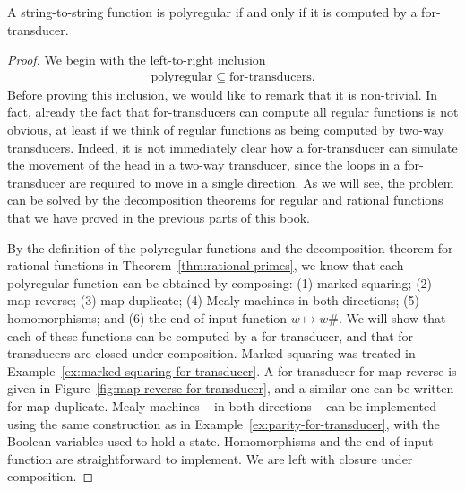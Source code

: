 \begin{theorem}
  \label{thm:for-transducers-are-polyregular}
  A string-to-string function is  polyregular if and only if it is computed by a for-transducer. 
\end{theorem}
\begin{proof}
We begin with the left-to-right inclusion
\begin{align*}
\text{polyregular} \subseteq \text{for-transducers}.
\end{align*}
Before proving this inclusion, we would like to remark that it is non-trivial. In fact, already the fact that for-transducers can compute all regular functions is not obvious, at least if we think of regular functions as being computed by two-way transducers. Indeed, it is not immediately clear how a for-transducer can simulate the movement of the head in a two-way transducer, since the loops in a for-transducer are required to move in  a single direction. As we will see, the problem can be solved by the decomposition theorems for regular and rational functions that we have proved in the previous parts of this book.

 By the definition of the polyregular functions and the decomposition theorem for rational functions in Theorem~\ref{thm:rational-primes}, we know that each polyregular function can be obtained by composing: (1) marked squaring; (2) map reverse; (3) map duplicate; (4) Mealy machines in both directions; (5) homomorphisms; and (6) the end-of-input function $w \mapsto w\#$. We will show that each of these functions can be computed by a for-transducer, and that for-transducers are closed under composition. Marked squaring was treated in Example~\ref{ex:marked-squaring-for-transducer}. A for-transducer for map reverse is given in Figure~\ref{fig:map-reverse-for-transducer}, and a similar one can be written for map duplicate. Mealy machines -- in both directions -- can be implemented using the same construction as in Example~\ref{ex:parity-for-transducer}, with the Boolean variables used to hold a state. Homomorphisms and the end-of-input function are straightforward to implement. We are left with closure under composition.







\end{proof}
